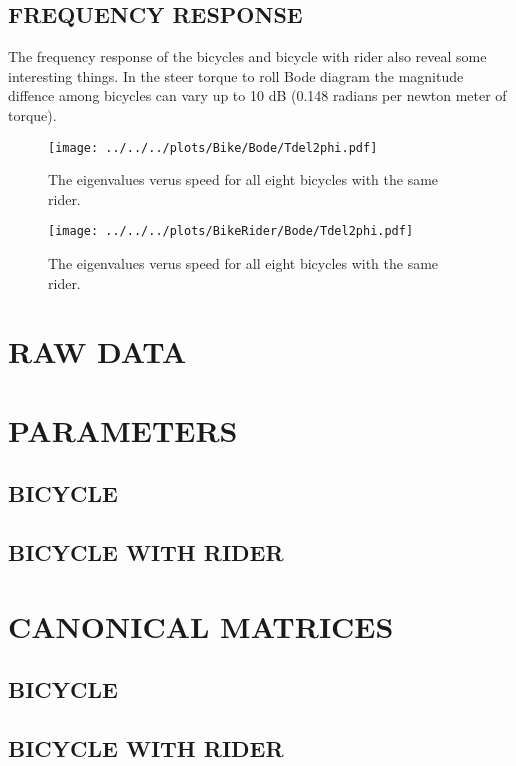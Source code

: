 \documentclass{bmd2010p}
\begin{document}
\subsection{FREQUENCY RESPONSE}
The frequency response of the bicycles and bicycle with rider also reveal some
interesting things. In the steer torque to roll Bode diagram the magnitude
diffence among bicycles can vary up to 10 dB (0.148 radians per newton meter of
torque).
\begin{figure}[tbp]
    \centering
    \texttt{[image: ../../../plots/Bike/Bode/Tdel2phi.pdf]}
    \caption{The eigenvalues verus speed for all eight bicycles with the same
    rider.}
    \label{fig:bikeBode}
\end{figure}
\begin{figure}[tbp]
    \centering
    \texttt{[image: ../../../plots/BikeRider/Bode/Tdel2phi.pdf]}
    \caption{The eigenvalues verus speed for all eight bicycles with the same
    rider.}
    \label{fig:bikeRiderBode}
\end{figure}



\appendix
\section{RAW DATA}
%
\section{PARAMETERS}
\subsection{BICYCLE}
\begin{landscape}

\end{landscape}
\subsection{BICYCLE WITH RIDER}
%
\section{CANONICAL MATRICES}
\subsection{BICYCLE}
\begin{landscape}

\end{landscape}
\subsection{BICYCLE WITH RIDER}
%
\end{document}
